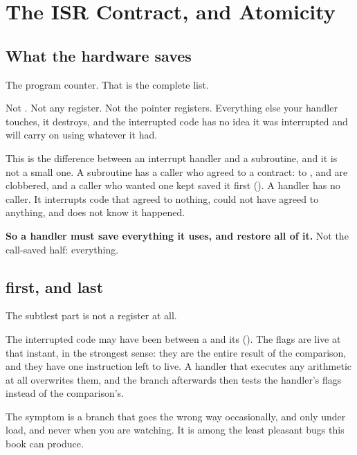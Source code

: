 
\section{The ISR Contract, and Atomicity}
\label{c3:sec:contract}

\subsection{What the hardware saves}
\label{c3:sec:saves}
The program counter. That is the complete list.

Not . Not any register. Not the pointer registers. Everything else your handler
touches, it destroys, and the interrupted code has no idea it was interrupted and will carry on
using whatever it had.

This is the difference between an interrupt handler and a subroutine, and it is not a small one. A
subroutine has a caller who agreed to a contract:  to ,  and
 are clobbered, and a caller who wanted one kept saved it first
(). A handler has no caller. It interrupts code that agreed to nothing,
could not have agreed to anything, and does not know it happened.

\textbf{So a handler must save everything it uses, and restore all of it.} Not the call-saved
half: everything.

\subsection{ first, and  last}
\label{c3:sec:sreg}
The subtlest part is not a register at all.

The interrupted code may have been between a  and its 
(). The flags are live at that instant, in the strongest sense: they are the
entire result of the comparison, and they have one instruction left to live. A handler that
executes any arithmetic at all overwrites them, and the branch afterwards then tests the handler's
flags instead of the comparison's.

The symptom is a branch that goes the wrong way occasionally, and only under load, and never when
you are watching. It is among the least pleasant bugs this book can produce.

